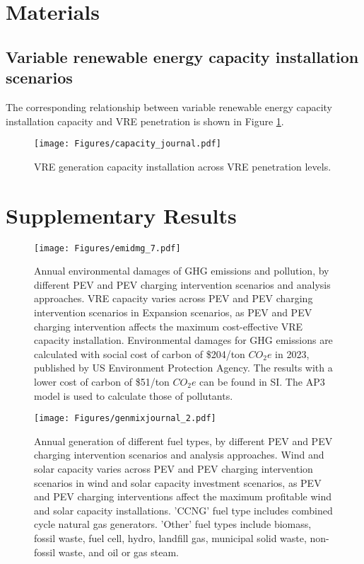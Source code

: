 \documentclass[9pt,twoside,lineno]{pnas-new}
\begin{document}


\section*{Materials}
\subsection{Variable renewable energy capacity installation scenarios}

The corresponding relationship between variable renewable energy capacity installation capacity and VRE penetration is shown in Figure \ref{fig:capacityexp}.

\begin{figure}[!ht]
    \centering
    \texttt{[image: Figures/capacity\_journal.pdf]}
    \caption{VRE generation capacity installation across VRE penetration levels.}
    \label{fig:capacityexp}
\end{figure}

\section*{Supplementary Results}

\begin{figure*}[!ht]
\centering
\texttt{[image: Figures/emidmg\_7.pdf]}
\caption{Annual environmental damages of GHG emissions and pollution, by different PEV and PEV charging intervention scenarios and analysis approaches. VRE capacity varies across PEV and PEV charging intervention scenarios in Expansion scenarios, as PEV and PEV charging intervention affects the maximum cost-effective VRE capacity installation. Environmental damages for GHG emissions are calculated with social cost of carbon of \$204/ton $CO_2e$ in 2023, published by US Environment Protection Agency\cite{noauthor_epa_2023}. The results with a lower cost of carbon of \$51/ton $CO_2e$ can be found in SI. The AP3 model is used to calculate those of pollutants.}
\label{fig:emisdmg}
\end{figure*}

\begin{figure*}
\centering
\texttt{[image: Figures/genmixjournal\_2.pdf]}
\caption{Annual generation of different fuel types, by different PEV and PEV charging intervention scenarios and analysis approaches. Wind and solar capacity varies across PEV and PEV charging intervention scenarios in wind and solar capacity investment scenarios, as PEV and PEV charging interventions affect the maximum profitable wind and solar capacity installations. 'CCNG' fuel type includes combined cycle natural gas generators. 'Other' fuel types include biomass, fossil waste, fuel cell, hydro, landfill gas, municipal solid waste, non-fossil waste, and oil or gas steam.}
\label{fig:genmixsi}
\end{figure*}
\end{document}
